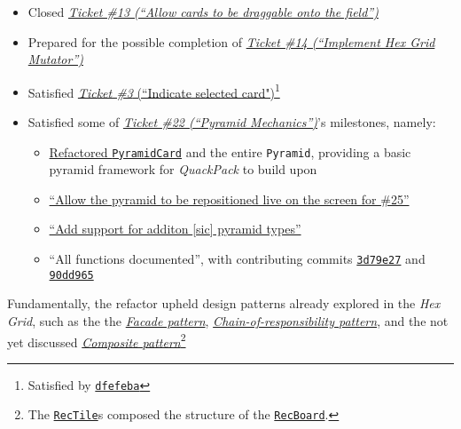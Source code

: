 \documentclass[11pt,a4paper]{report}
\begin{document}
\begin{itemize}
    \item Closed \href{https://github.com/UQdeco2800/deco2800-2016-pyramidscheme/issues/13}{\textit{Ticket \#13 (``Allow cards to be draggable onto the field'')}}
    \item Prepared for the possible completion of \href{https://github.com/UQdeco2800/deco2800-2016-pyramidscheme/issues/14}{\textit{Ticket \#14 (``Implement Hex Grid Mutator'')}} 
    \item Satisfied \href{https://github.com/UQdeco2800/deco2800-2016-pyramidscheme/issues/3}{\textit{Ticket \#3} (``Indicate selected card")}\footnote{Satisfied by \href{https://github.com/UQdeco2800/deco2800-2016-pyramidscheme/commit/dfefeba9a5a475e89342cc194c8275360c87f9e6}{\texttt{dfefeba}}}
    \item Satisfied some of \href{https://github.com/UQdeco2800/deco2800-2016-pyramidscheme/issues/22}{\textit{Ticket \#22 (``Pyramid Mechanics'')}}'s milestones, namely:

    \begin{itemize}
        \item \href{https://github.com/UQdeco2800/deco2800-2016-pyramidscheme/commit/f0ac7f45c4df6694408caf87244c1e37eaff4b0f}{Refactored \texttt{PyramidCard}} and the entire \texttt{Pyramid}, providing a basic pyramid framework for \textit{QuackPack} to build upon
        \item \href{https://github.com/UQdeco2800/deco2800-2016-pyramidscheme/commit/f0ac7f45c4df6694408caf87244c1e37eaff4b0f\#diff-9f235f95066aaa944fb25765711f84a2R29}{``Allow the pyramid to be repositioned live on the screen for \#25''}
        \item \href{https://github.com/UQdeco2800/deco2800-2016-pyramidscheme/commit/f0ac7f45c4df6694408caf87244c1e37eaff4b0f\#diff-9f235f95066aaa944fb25765711f84a2R43}{``Add support for additon {[}sic{]} pyramid types''}
        \item ``All functions documented'', with contributing commits \href{https://github.com/UQdeco2800/deco2800-2016-pyramidscheme/commit/3d79e279c851443f273996fe3942bdc8f2baf06e}{\texttt{3d79e27}} and \href{https://github.com/UQdeco2800/deco2800-2016-pyramidscheme/commit/90dd96511f1320118fb9ee568cf91995a5fb0a87}{\texttt{90dd965}} 
    \end{itemize}
\end{itemize}

Fundamentally, the refactor upheld design patterns already explored in the \textit{Hex Grid}, such as the the \href{https://en.wikipedia.org/wiki/Facade_pattern}{\textit{Facade pattern}}, \href{https://en.wikipedia.org/wiki/Chain-of-responsibility_pattern}{\textit{Chain-of-responsibility pattern}}, and the not yet discussed \href{https://en.wikipedia.org/wiki/Composite_pattern}{\textit{Composite pattern}}\footnote{The \href{https://github.com/UQdeco2800/deco2800-2016-pyramidscheme/blob/master/pyramidscheme/src/main/java/uq/deco2800/pyramidscheme/board/RecTile.java}{\texttt{RecTile}}s composed the structure of the \href{https://github.com/UQdeco2800/deco2800-2016-pyramidscheme/blob/master/pyramidscheme/src/main/java/uq/deco2800/pyramidscheme/board/RecBoard.java}{\texttt{RecBoard}}.} 
\end{document}
